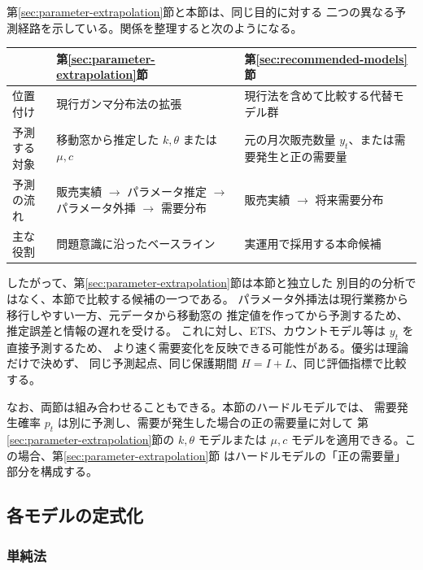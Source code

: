 \documentclass[a4paper,11pt]{jsarticle}
\begin{document}
第\ref{sec:parameter-extrapolation}節と本節は、同じ目的に対する
二つの異なる予測経路を示している。関係を整理すると次のようになる。
\begin{center}
\begin{tabular}{>{\raggedright\arraybackslash}p{28mm}
                >{\raggedright\arraybackslash}p{50mm}
                >{\raggedright\arraybackslash}p{50mm}}
\toprule
 & 第\ref{sec:parameter-extrapolation}節 & 第\ref{sec:recommended-models}節\\
\midrule
位置付け & 現行ガンマ分布法の拡張 & 現行法を含めて比較する代替モデル群\\
予測する対象 & 移動窓から推定した $k,\theta$ または $\mu,c$
& 元の月次販売数量 $y_t$、または需要発生と正の需要量\\
予測の流れ & 販売実績 $\rightarrow$ パラメータ推定
$\rightarrow$ パラメータ外挿 $\rightarrow$ 需要分布
& 販売実績 $\rightarrow$ 将来需要分布\\
主な役割 & 問題意識に沿ったベースライン & 実運用で採用する本命候補\\
\bottomrule
\end{tabular}
\end{center}

したがって、第\ref{sec:parameter-extrapolation}節は本節と独立した
別目的の分析ではなく、本節で比較する候補の一つである。
パラメータ外挿法は現行業務から移行しやすい一方、元データから移動窓の
推定値を作ってから予測するため、推定誤差と情報の遅れを受ける。
これに対し、ETS、カウントモデル等は $y_t$ を直接予測するため、
より速く需要変化を反映できる可能性がある。優劣は理論だけで決めず、
同じ予測起点、同じ保護期間 $H=I+L$、同じ評価指標で比較する。

なお、両節は組み合わせることもできる。本節のハードルモデルでは、
需要発生確率 $p_t$ は別に予測し、需要が発生した場合の正の需要量に対して
第\ref{sec:parameter-extrapolation}節の $k,\theta$ モデルまたは
$\mu,c$ モデルを適用できる。この場合、第\ref{sec:parameter-extrapolation}節
はハードルモデルの「正の需要量」部分を構成する。

\subsection{各モデルの定式化}

\subsubsection{単純法}
\end{document}
